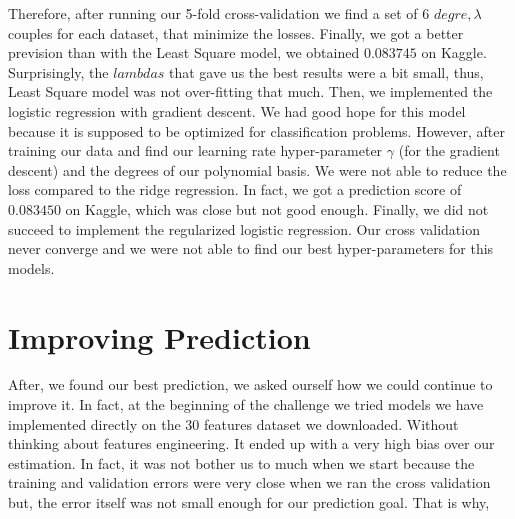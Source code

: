 \documentclass[10pt,conference,compsocconf]{IEEEtran}
\begin{document}
Therefore, after running our 5-fold cross-validation we find a set of 6 $degre, \lambda$ couples for each dataset, that minimize the losses. Finally, we got a better prevision than with the Least Square model, we obtained $0.083745$ on Kaggle. Surprisingly, the $lambdas$ that gave us the best results were a bit small, thus, Least Square model was not over-fitting that much.
Then, we implemented the logistic regression with gradient descent. We had good hope for this model because it is supposed to be optimized for classification problems. However, after training our data and find our learning rate hyper-parameter $\gamma$ (for the gradient descent) and the degrees of our polynomial basis. We were not able to reduce the loss compared to the ridge regression. In fact, we got a prediction score of $0.083450$ on Kaggle, which was close but not good enough.
Finally, we did not succeed to implement the regularized logistic regression. Our cross validation never converge and we were not able to find our best hyper-parameters for this models.


\section{Improving Prediction}

After, we found our best prediction, we asked ourself how we could continue to improve it. In fact, at the beginning of the challenge we tried models we have implemented directly on the 30 features dataset we downloaded. Without thinking about features engineering. It ended up with a very high bias over our estimation. In fact, it was not bother us to much when we start because the training and validation errors were very close when we ran the cross validation but, the error itself was not small enough for our prediction goal. That is why, \\
\\
\\
\end{document}
